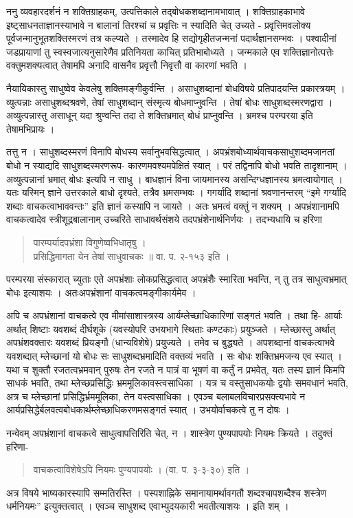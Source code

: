 ननु व्यवहारदर्शनं न शक्तिग्राहकम्, उत्पत्तिकाले तद्बोधकशब्दानामभावात् । शक्तिग्राहकाभावे इष्ट्साधनताज्ञानस्याभावे न बालानां तिरश्चां च प्रवृत्तिः न स्यादिति चेत् उच्यते - प्रवृत्तिमवलोक्य पूर्वजन्मानुभूतशक्तिस्मरणं तत्र कल्प्यते । तस्मादेव हि सद्योगृहीतजन्मनां पदार्थज्ञानसम्भवः । पश्वादीनां जडप्रायाणां तु स्वस्वजात्यनुसारेणैव प्रतिनियता काचित् प्रतिभाबोध्यते । जन्मकाले एव शक्तिज्ञानोत्पत्तेः वक्तुमशक्यत्वात् तेषामपि अनादि वासनैव प्रवृत्तौ निवृत्तौ वा कारणां भवति । 

नैयायिकास्तु साधुष्वेव केवलेषु शक्तिमङ्गीकुर्वन्ति । असाधुशब्दानां बोधविषये प्रतिपादयन्ति प्रकारत्रयम् । व्युत्पन्नाः असाधुशब्दश्रवणे, तेषां साधुशब्दान् संस्मृत्य बोधमाप्नुवन्ति । तेषां बोधः साधुशब्दस्मरणद्वारा । अव्युत्पन्नास्तु असाधून् यदा श्रुण्वन्ति तदा ते शक्तिभ्रमात् बोधं प्राप्नुवन्ति । भ्रमश्च परम्परया इति तेषामभिप्रायः ।

तत्तु न । साधुशब्दस्मरणं विनापि बोधस्य सर्वानुभवसिद्धत्वात् । अपभ्रंशबोध्यार्थवाचकसाधुशब्दमजानतां बोधो न स्याद्यदि साधुशब्दस्मरणरूप- कारणमवश्यमपेक्षितं स्यात् । परं तद्विनापि बोधो भवति तादृशानाम् । अव्युत्पन्नानां भ्रमात् बोधः इत्यपि न साधु । बाधज्ञानं विना जायमानस्य असन्दिग्धज्ञानस्य भ्रमत्वायोगात् । यतः यस्मिन् ज्ञाने उत्तरकाले बाधो दृश्यते, तत्रैव भ्रमसम्भवः । गगर्यादि शब्दानां श्रवणानन्तरम् “इमे गर्ग्यादि शब्दाः वाचकत्वाभाववन्तः” इति ज्ञानं कस्यापि न जायते । अतः भ्रमत्वं वक्तुं न शक्यम् । अपभ्रंशानामपि वाचकत्वादेव स्त्रीशूद्रबालानाम् उच्चरिते साधावर्थसंशये तदपभ्रंशेनार्थनिर्णयः । तदभ्यधायि च हरिणा 
\begin{verse}
पारम्पर्यादपभ्रंशा विगुणेष्वभिधातृषु । \\
प्रसिद्धिमागता येन तेषां साधुवाचकः ॥ वा. प. २-१५३ इति ।
\end{verse}
परम्परया संस्कारात् च्युताः एते अपभ्रंशाः लोकप्रसिद्धत्वात्  अपभ्रंशैः स्मारिता भवन्ति, न् तु तत्र साधुत्वभ्रमात् बोधः इत्याशयः । अतःअपभ्रंशानां वाचकत्वमङ्गीकार्यमेव ।

अपि च अपभ्रंशानां वाचकत्वे एव मीमांसाशास्त्रस्य आर्यम्लेच्छाधिकारिणां सङ्गतं भवति । तथा हि- आर्याः अर्थात् शिष्टाः यवशब्दं दीर्घशूके (यवस्योपरि उभयभागे स्थिताः कण्टकाः) प्रयुञ्जते । म्लेच्छास्तु अर्थात् अपभ्रंशवक्तारः यवशब्दं प्रियङ्गौ (धान्यविशेषे) प्रयुज्यते । तमेव च बुद्ध्यते । अपशब्दानां वाचकत्वाभवे यवशब्दात् म्लेच्छानां यो बोधः सः साधुशब्दभ्रमादिति वक्तव्यं भवति । सः बोधः शक्तिभ्रमजन्य एव स्यात् । यथा च शुक्तौ रजतत्वभ्रमवान् पुरुषः तेन रजते न पात्रं वा भूषणं वा कर्तुं न प्रभवेत्, यतः तस्य ज्ञानं किमपि साधकं भवति, तथा म्लेच्छप्रसिद्धिः भ्रममूलिकावस्त्वसाधिका । यत्र च वस्तुसाधकयोः द्वयोः समवधानं भवति, अत्र च म्लेच्छानां प्रसिद्धिर्भ्रममूलिका, तेन वस्त्वसाधिका । एवञ्च बलाबलविचारप्रसक्त्यभावे न आर्यप्रसिद्धेर्बलवत्वबोधकार्थम्लेच्छाधिकरणमसङ्गतं स्यात् । उभयोर्वाचकत्वे तु न दोषः ।

नन्वेवम् अपभ्रंशानां वाचकत्वे साधुत्वापत्तिरिति चेत्, न । शास्त्रेण पुण्यपापयोः नियमः क्रियते । तदुक्तं हरिणा-
\begin{verse}
वाचकत्वाविशेषेऽपि नियमः पुण्यपापयोः । (वा. प. ३-३-३०) इति । 
\end{verse}
अत्र विषये भाष्यकारस्यापि सम्मतिरस्ति । पस्पशाह्निके समानायामर्थावगतौ शब्दश्चापशब्दैश्च शस्त्रेण धर्मनियमः” इत्युक्तत्वात् । एवञ्च साधुशब्द एवाभ्युदयकारी भवतीत्याशयः । इति शम् ।

\articleend

